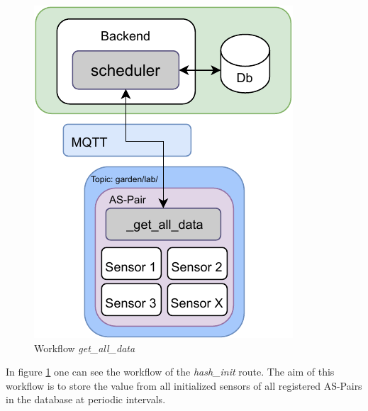 \begin{figure}
    \centering
     \captionsetup{justification=centering}
     \begin{minipage}[b]{0.39\textwidth}
         \centering
         \includegraphics[width=\textwidth]{images/4_2_1/scheduler_all_data.pdf}
         \caption{Workflow \textit{get\_all\_data}}
         \label{fig:schedule}
     \end{minipage}
     \vspace{-.25\baselineskip}
\end{figure}

\newpage


In figure \ref{fig:schedule} one can see the workflow of the \textit{hash\_init} route. The aim of this workflow is to store the value from all initialized sensors of all registered AS-Pairs in the database at periodic intervals.\\

